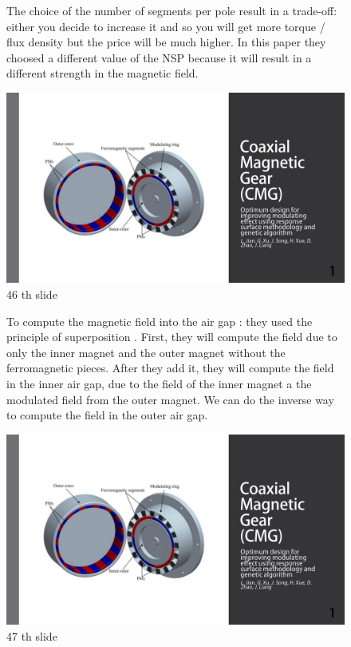\begin{figure}[H]
    \begin{minipage}{.45\linewidth}
    The choice of the number of segments per pole result in a trade-off: either you decide to increase it and so you will get more torque / flux density but the price will be much higher. In this paper they choosed a different value of the NSP because it will result in a different strength in the magnetic field.
    \end{minipage}
    \hfill%
    \begin{minipage}[c]{.45\linewidth}
        \centering
        \includegraphics[page={46},width=\textwidth]{LELEC2311.allow.pdf}
        \caption{46 th slide}
    \end{minipage}
\end{figure}


\begin{figure}[H]
    \begin{minipage}{.45\linewidth}
    To compute the magnetic field into the air gap : they used the principle of superposition . First, they will compute the field due to only the inner magnet and the outer magnet without the ferromagnetic pieces. After they add it, they will compute the field in the inner air gap, due to the field of the inner magnet a the modulated field from the outer magnet. We can do the inverse way to compute the field in the outer air gap.
    \end{minipage}
    \hfill%
    \begin{minipage}[c]{.45\linewidth}
        \centering
        \includegraphics[page={47},width=\textwidth]{LELEC2311.allow.pdf}
        \caption{47 th slide}
    \end{minipage}
\end{figure}



